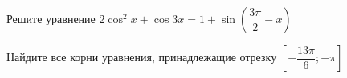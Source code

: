 \begin{ex}
	\begin{condition}
		\begin{enumcols}[label=\asbuk*)]
			\item Решите уравнение \( 2\cos^2 x + \cos 3x = 1+\sin{\left(\dfrac{3\pi}{2}-x\right)} \)
			\item Найдите все корни уравнения, принадлежащие отрезку \( \left[-\dfrac{13\pi}{6};-\pi\right] \)
		\end{enumcols}
	\end{condition}
\end{ex}